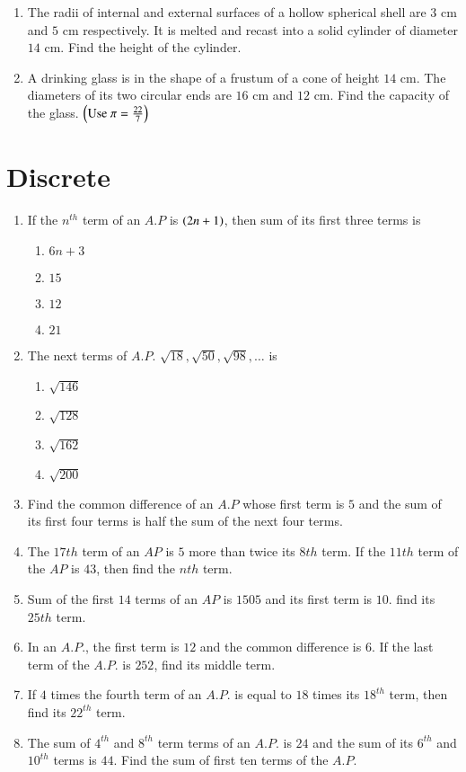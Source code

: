 \documentclass[journal,12pt,onecolumn]{IEEEtran}
\theoremstyle{remark}
\begin{document}
\begin{enumerate}
\item The radii of internal and external surfaces of a hollow spherical shell are $3\text{ cm}$ and $5\text{ cm}$ respectively. It is melted and recast into a solid cylinder of diameter $14\text{ cm}$. Find the height of the cylinder. 

\item A drinking glass is in the shape of a frustum of a cone of height $14\text{ cm}$. The diameters of its two circular ends are $16\text{ cm}$ and $12\text{ cm}$. Find the capacity of the glass. $\left(\text{Use } \pi = \frac{22}{7}\right)$ 

\end{enumerate}
\section{Discrete}
\begin{enumerate}
\item If the $n^{th}$ term of an $A.P$ is $\left(2n+1\right)$, then sum of its first three terms is 
\begin{enumerate}
\item $6n + 3$ 
\item $15$ 
\item $12$ 
\item $21$ 
\end{enumerate}
\item The next terms of $A.P.$ $\sqrt {18}, \sqrt {50}, \sqrt {98}, \ldots$ is 
\begin{enumerate}
\item $\sqrt {146}$ 
\item $\sqrt {128}$ 
\item $\sqrt {162}$ 
\item $\sqrt {200}$ 
\end{enumerate}
\item Find the common difference of an $A.P$ whose first term is $5$ and the sum of its first four terms is half the sum of the next four terms. 
\item The $17th$ term of an $AP$ is $5$ more than twice its $8th$ term. If the $11th$ term of the $AP$ is $43$, then find the $nth$ term. 

\item Sum of the first $14$ terms of an $AP$ is $1505$ and its first term is $10$. find its $25th$ term. 
\item In an $A.P.$, the first term is $12$ and the common difference is $6$. If the last term of the $A.P.$ is $252$, find its middle term. 
\item If $4$ times the fourth term of an $A.P.$ is equal to $18$ times its $18^{th}$ term, then find its $22^{th}$ term. 
\item The sum of $4^{th}$ and $8^{th}$ term terms of an $A.P.$ is $24$ and the sum of its $6^{th}$ and $10^{th}$ terms is $44$. Find the sum of first ten terms of the $A.P.$ 
\end{enumerate}
\end{document}
